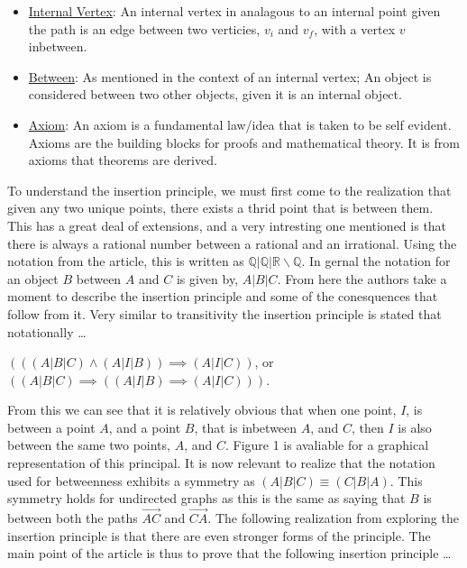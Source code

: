 \documentclass[a4paper,man,natbib]{apa6}
\newcommand{\R}{\mathbb{R}}  %
\newcommand{\Q}{\mathbb{Q}}  %
\begin{document}
\begin{itemize}
      \item \underline{Internal Vertex}: An internal vertex in analagous to an internal point given the path is an edge between two verticies,  $ v_i $ and $ v_f $, with a vertex $ v $ inbetween. 

      \item \underline{Between}: As mentioned in the context of an internal vertex; An object is considered between two other objects, given it is an internal object. 

      \item \underline{Axiom}: An axiom is a fundamental law/idea that is taken to be self evident. Axioms are the building blocks for proofs and mathematical theory. It is from axioms that theorems are derived.
      
\end{itemize}

\noindent
To understand the insertion principle, we must first come to the realization that given any two unique points, there exists a thrid point that is between them. 
This has a great deal of extensions, and a very intresting one mentioned is that there is always a rational number between a rational and an irrational. 
Using the notation from the article, this is written as $ \Q | \Q | \R \backslash \Q $. 
In gernal the notation for an object $ B $ between $ A $ and $ C $ is given by, $ A | B | C $. 
From here the authors take a moment to describe the insertion principle and some of the conesquences that follow from it. 
Very similar to transitivity the insertion principle is stated that notationally \dots

\begin{center}

      $ ( ( (A | B | C) \land (A | I | B) ) \implies (A | I | C) ) $, or $ ( (A | B | C) \implies( (A | I | B) \implies (A | I | C) ) ) $. 

\end{center}

\noindent
From this we can see that it is relatively obvious that when one point, $ I $, is between a point $ A $, and a point $ B $, that is inbetween $ A $, and $ C $, then $ I $ is also between the same two points, $ A $, and $ C $.
Figure 1 is avaliable for a graphical representation of this principal. It is now relevant to realize that the notation used for betweenness exhibits a symmetry as $  (A | B | C) \equiv (C | B | A) $. 
This symmetry holds for undirected graphs as this is the same as saying that $ B $ is between both the paths $ \overrightarrow{AC} $ and $ \overrightarrow{CA} $. 
The following realization from exploring the insertion principle is that there are even stronger forms of the principle. 
The main point of the article is thus to prove that the following insertion principle \dots 
\end{document}

